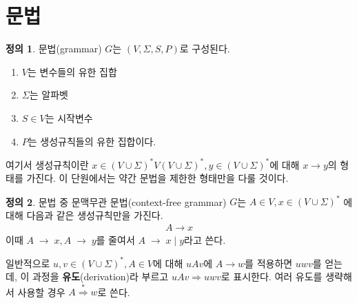 \documentclass[b5paper, 11pt]{book}
\theoremstyle{definition}
\newtheorem{defn}{정의}[chapter]
\begin{document}
\section{문법}
\begin{defn}
    문법(grammar) $G$는 $(V, \Sigma, S, P)$로 구성된다.
\end{defn} 
\begin{enumerate}
    \item $V$는 변수들의 유한 집합
    \item $\Sigma$는 알파벳
    \item $S \in V$는 시작변수
    \item $P$는 생성규칙들의 유한 집합이다. 
\end{enumerate}
여기서 생성규칙이란 $x\in (V \cup \Sigma)^* V 
(V \cup \Sigma )^*, y \in (V \cup \Sigma)^*$에 대해 $x \rightarrow y$의 형태를 가진다.
이 단원에서는 약간 문법을 제한한 형태만을 다룰 것이다. 
\begin{defn}
    문법 중 문맥무관 문법(context-free grammar) $G$는 $A \in V, x \in (V \cup \Sigma)^*$ 에 대해
다음과 같은 생성규칙만을 가진다.
\begin{align*}
    A \rightarrow x
\end{align*}
이때 $A \; \rightarrow \; x, A\; \rightarrow \; y$를 줄여서 $A \; \rightarrow \; x \; \vert \; y $라고 쓴다.
\end{defn} 
일반적으로 $u, v \in (V \cup \Sigma)^*, A \in V$에 대해 $uAv$에 $A \rightarrow w$를 적용하면 $uwv$를 얻는데, 이 과정을 \textbf{유도}(derivation)라 부르고 $uAv \Rightarrow uwv$로 표시한다. 여러 유도를 생략해서 사용할 경우 $A \overset{*}{\Rightarrow} w$로 쓴다. 
\end{document}
